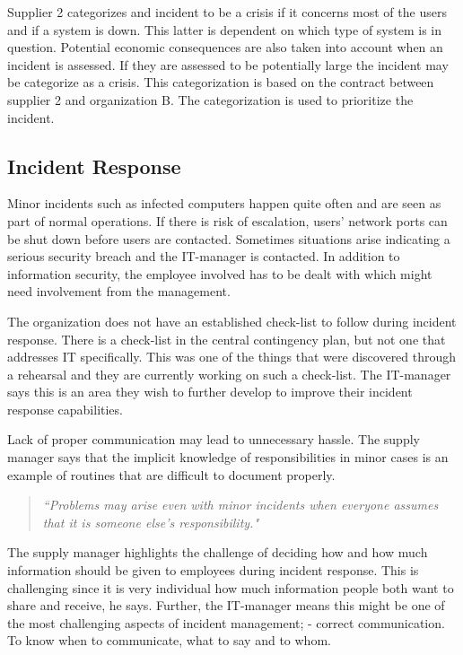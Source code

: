Supplier 2 categorizes and incident to be a crisis if it concerns most of the users and if a system is down. This latter is dependent on which type of system is in question. Potential economic consequences are also taken into account when an incident is assessed. If they are assessed to be potentially large the incident may be categorize as a crisis. This categorization is based on the contract between supplier 2 and organization B. The categorization is used to prioritize the incident.

\subsection{Incident Response}
Minor incidents such as infected computers happen quite often and are seen as part of normal operations. If there is risk of escalation, users' network ports can be shut down before users are contacted. Sometimes situations arise indicating a serious security breach and the IT-manager is contacted. In addition to information security, the employee involved has to be dealt with which might need involvement from the management.

The organization does not have an established check-list to follow during incident response. There is a check-list in the central contingency plan, but not one that addresses IT specifically. This was one of the things that were discovered through a rehearsal and they are currently working on such a check-list. The IT-manager says this is an area they wish to further develop to improve their incident response capabilities. 

Lack of proper communication may lead to unnecessary hassle. The supply manager says that the implicit knowledge of responsibilities in minor cases is an example of routines that are difficult to document properly.

\begin{quote}
\textit{``Problems may arise even with minor incidents when everyone assumes that it is someone else's responsibility."}
\end{quote}

The supply manager highlights the challenge of deciding how and how much information should be given to employees during incident response. This is challenging since it is very individual how much information people both want to share and receive, he says. Further, the IT-manager means this might be one of the most challenging aspects of incident management; - correct communication. To know when to communicate, what to say and to whom. 

